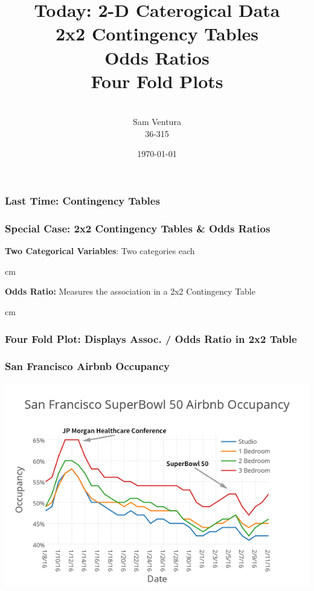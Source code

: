 \documentclass{beamer} %
\begin{document}
\title[dedup]{Today:  2-D Caterogical Data \\ 2x2 Contingency Tables \\ Odds Ratios \\ Four Fold Plots}


\author[Samuel L. Ventura]{\\
  \large{Sam Ventura\\36-315}}
\date{\today}


\begin{frame}
	\maketitle
	
\end{frame}



\begin{frame}\frametitle{Last Time:  Contingency Tables}
	\small
	
\end{frame}


\begin{frame}\frametitle{Special Case:  2x2 Contingency Tables \& Odds Ratios}
	\small
	
	\textbf{Two Categorical Variables}:  Two categories each%
	
	 cm
	
	\textbf{Odds Ratio:}  Measures the association in a 2x2 Contingency Table
	
	 cm
	
\end{frame}


\begin{frame}\frametitle{Four Fold Plot:  Displays Assoc. / Odds Ratio in 2x2 Table}
	\small



	
\end{frame}






\begin{frame}\frametitle{San Francisco Airbnb Occupancy}
	\includegraphics[width=\linewidth]{airbnb.png}
\end{frame}
\end{document}

